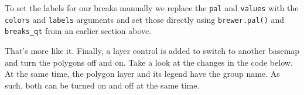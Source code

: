 \documentclass[
  11pt,
]{book}
\newenvironment{Shaded}{\begin{snugshade}}{\end{snugshade}}
\newcommand{\AttributeTok}[1]{\textcolor[rgb]{0.77,0.63,0.00}{#1}}
\newcommand{\ConstantTok}[1]{\textcolor[rgb]{0.00,0.00,0.00}{#1}}
\newcommand{\DecValTok}[1]{\textcolor[rgb]{0.00,0.00,0.81}{#1}}
\newcommand{\FloatTok}[1]{\textcolor[rgb]{0.00,0.00,0.81}{#1}}
\newcommand{\FunctionTok}[1]{\textcolor[rgb]{0.00,0.00,0.00}{#1}}
\newcommand{\NormalTok}[1]{#1}
\newcommand{\SpecialCharTok}[1]{\textcolor[rgb]{0.00,0.00,0.00}{#1}}
\newcommand{\StringTok}[1]{\textcolor[rgb]{0.31,0.60,0.02}{#1}}
\begin{document}
To set the labels for our breaks manually we replace the \texttt{pal} and \texttt{values} with the \texttt{colors} and \texttt{labels} arguments and set those directly using \texttt{brewer.pal()} and \texttt{breaks\_qt} from an earlier section above.

\begin{Shaded}
\end{Shaded}

That's more like it. Finally, a layer control is added to switch to another basemap and turn the polygons off and on. Take a look at the changes in the code below. At the same time, the polygon layer and its legend have the group name. As such, both can be turned on and off at the same time.
\end{document}
